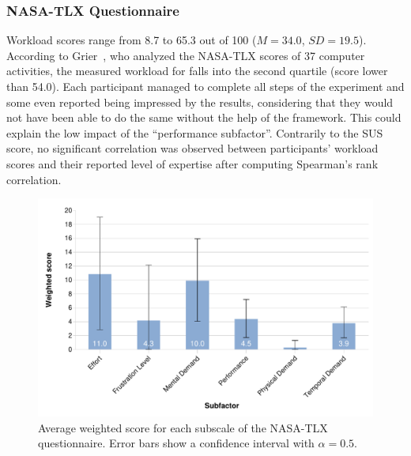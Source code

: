 \subsubsection{NASA-TLX Questionnaire}
Workload scores range from 8.7 to 65.3 out of 100 ($M{=}34.0$, $SD{=}19.5$). According to Grier~\cite{Grier:2015}, who analyzed the NASA-TLX scores of 37 computer activities, the measured workload for \ql falls into the second quartile (score lower than 54.0). Each participant managed to complete all steps of the experiment and some even reported being impressed by the results, considering that they would not have been able to do the same without the help of the framework. This could explain the low impact of the ``performance subfactor''. 
 Contrarily to the SUS score, no significant correlation was observed between participants' workload scores and their reported level of expertise after computing Spearman's rank correlation.

\begin{figure}[t]
    \centering
    \includegraphics[width=.8\linewidth]{Figures/QuantumLeap/Evaluation/NASA-TLX-scores.pdf}
    \vspace{-12pt}
    \caption{Average weighted score for each subscale of the NASA-TLX questionnaire. Error bars show a confidence interval with $\alpha{=}0.5$.}
    \vspace{-8pt}
    \label{fig:quantumleap:nasa-tlx-scores}
\end{figure}

